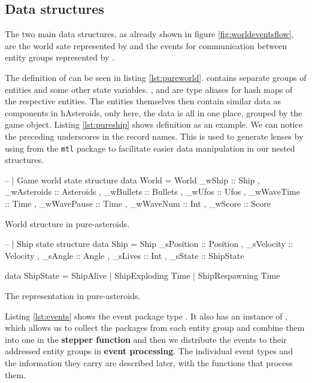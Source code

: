 \documentclass[
  digital, %
  color,   %
  table,   %
  oneside, %
  lof,     %
  lot,     %
]{fithesis3}
\newcommand{\packagename}{\texttt}
\begin{document}
\subsection{Data structures}
The two main data structures, as already shown in figure \ref{fig:worldeventsflow},
are the world sate represented by  and the events for communication
between entity groups represented by .

The definition of  can be seen in listing \ref{lst:pureworld}.
 contains separate groups of entities and some other state variables.
,  and  are type
aliases for hash maps of the respective entities.
The entities themselves then contain similar data as components in hAsteroids,
only here, the data is all in one place, grouped by the game object.
Listing \ref{lst:pureship} shows  definition as an example.
We can notice the preceding underscores in the record names. This is used
to generate lenses by using  from the \packagename{mtl} package
to facilitate easier data manipulation in our nested structures.

\begin{listing}[H]
\begin{haskell}
-- | Game world state structure 
data World =
    World
    { _wShip      :: Ship 
    , _wAsteroids :: Asteroids
    , _wBullets   :: Bullets
    , _wUfos      :: Ufos
    , _wWaveTime  :: Time
    , _wWavePause :: Time
    , _wWaveNum   :: Int
    , _wScore     :: Score
    }
\end{haskell}
\caption{World structure in pure-asteroids.}
\label{lst:pureworld}
\end{listing}

\begin{listing}[H]
\begin{haskell}
-- | Ship state structure
data Ship =
    Ship 
    { _sPosition :: Position
    , _sVelocity :: Velocity
    , _sAngle    :: Angle
    , _sLives    :: Int
    , _sState    :: ShipState
    }

data ShipState
    = ShipAlive
    | ShipExploding Time
    | ShipRespawning Time
\end{haskell}
\caption{The  representation in pure-asteroids.}
\label{lst:pureship}
\end{listing}

Listing \ref{lst:events} shows the event package type .
It also has an instance of , which allows us to collect the packages from
each entity group and combine them into one in the \textbf{stepper function}
and then we distribute the events to their addressed entity groups in \textbf{event processing}.
The individual event types and the information they carry are described later,
with the functions that process them.
\end{document}

